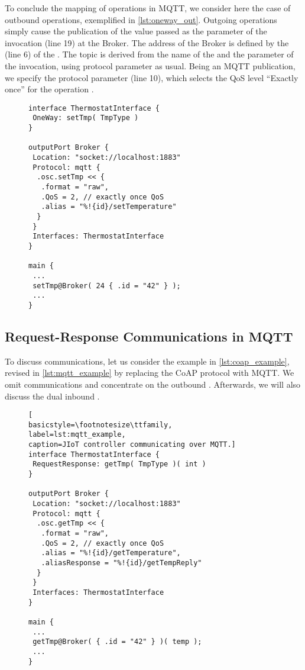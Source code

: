 To conclude the mapping of  operations in MQTT, we consider here
the case of outbound operations, exemplified in \cref{lst:oneway_out}.
%
Outgoing  operations simply cause the publication of the value
passed as the parameter of the invocation (line 19) at the Broker. The
address of the Broker is defined by the  (line 6) of the
 . The topic is derived from the name of the
 and the parameter of the invocation, using protocol parameter
 as usual. Being an MQTT publication, we specify the
 protocol parameter (line 10), which selects the QoS level
``Exactly once'' for the operation .

\begin{figure}[t]
\begin{lstlisting}[basicstyle=\footnotesize\ttfamily,caption={Example of
outgoing MQTT \code{OneWay} communication.},label=lst:oneway_out]
interface ThermostatInterface {
 OneWay: setTmp( TmpType )
}

outputPort Broker {
 Location: "socket://localhost:1883"
 Protocol: mqtt {
  .osc.setTmp << {
   .format = "raw",
   .QoS = 2, // exactly once QoS
   .alias = "%!{id}/setTemperature"
  }
 }
 Interfaces: ThermostatInterface
}

main {
 ...
 setTmp@Broker( 24 { .id = "42" } );
 ...
}
\end{lstlisting}
\end{figure}

\subsection{Request-Response Communications in MQTT}
\label{sub:rr_in_mqtt}

To discuss  communications, let us consider the
example in \cref{lst:coap_example}, revised in \cref{lst:mqtt_example}
by replacing the CoAP protocol with MQTT. We omit 
communications and concentrate on the
outbound . Afterwards, we will also discuss the
dual inbound .

\begin{figure}[t]
\begin{lstlisting}[
basicstyle=\footnotesize\ttfamily,
label=lst:mqtt_example,
caption=JIoT controller communicating over MQTT.]
interface ThermostatInterface {
 RequestResponse: getTmp( TmpType )( int )
}

outputPort Broker {
 Location: "socket://localhost:1883"
 Protocol: mqtt {
  .osc.getTmp << {
   .format = "raw",
   .QoS = 2, // exactly once QoS
   .alias = "%!{id}/getTemperature",
   .aliasResponse = "%!{id}/getTempReply"
  }
 }
 Interfaces: ThermostatInterface
}

main {
 ...
 getTmp@Broker( { .id = "42" } )( temp );
 ...
}
\end{lstlisting}
\end{figure}

